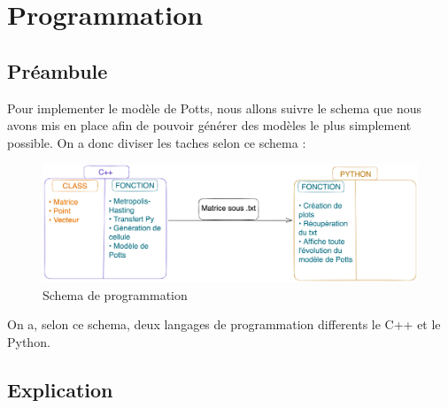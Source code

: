 

\chapter{Programmation}
\setcounter{chapter}{1}

\begin{article}
    \section{Préambule}\label{sec:preambule}%
    Pour implementer le modèle de Potts, nous allons suivre le schema que nous avons mis en place afin de pouvoir générer des modèles le plus simplement possible.
    \newline On a donc diviser les taches selon ce schema :
    \newline
    \begin{figure}[ht]
        \centering
        \includegraphics[scale=0.09]{./img/prog/Schema_prog}
        \caption{Schema de programmation}
        \label{fig1}
    \end{figure}

    On a, selon ce schema, deux langages de programmation differents le C++ et le Python.

    \section{Explication}\label{sec:explication}

\end{article}

